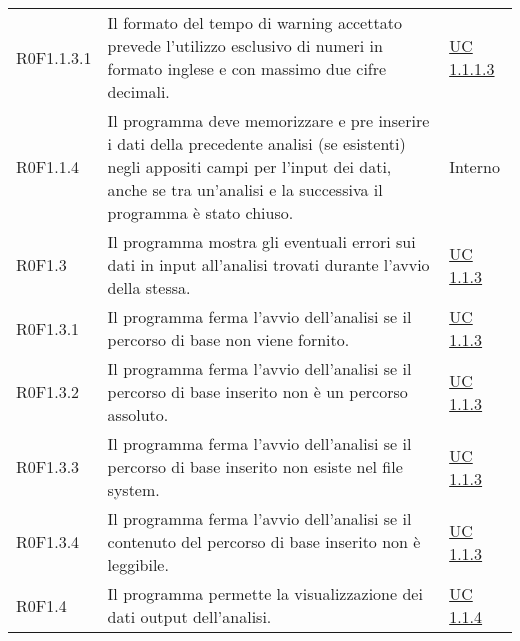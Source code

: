 \begin{center}
\begin{longtable}{p{4.2cm}!{\color{white}\vrule width 0.5mm}p{6cm}!{\color{white}\vrule width 0.5mm}p{2.5cm}!{\color{white}\vrule width 0.5mm}}
				\hspace{6mm}\hypertarget{R0F1.1.3.1}{R0F1.1.3.1}  & Il formato del tempo di warning accettato prevede l'utilizzo esclusivo di numeri in formato inglese e con massimo due cifre decimali. & \hyperref[subsec:UC1.1.1.3]{UC 1.1.1.3}\\
				
				
				\hspace{4mm}\hypertarget{R0F1.1.4}{R0F1.1.4}  & Il programma deve memorizzare e pre inserire i dati della precedente analisi (se esistenti) negli appositi campi per l'input dei dati, anche se tra un'analisi e la successiva il programma è stato chiuso. & Interno\\
				
				
				\hspace{2mm}\hypertarget{R0F1.3}{R0F1.3} & Il programma mostra gli eventuali errori sui dati in input all'analisi trovati durante l'avvio della stessa. & \hyperref[subsec:UC1.1.3]{UC 1.1.3}\\
				
				\hspace{4mm}\hypertarget{R0F1.3.1}{R0F1.3.1} & Il programma ferma l'avvio dell'analisi se il percorso di base non viene fornito. & \hyperref[subsec:UC1.1.3]{UC 1.1.3}\\
				
				\hspace{4mm}\hypertarget{R0F1.3.2}{R0F1.3.2} & Il programma ferma l'avvio dell'analisi se il percorso di base inserito non è un percorso assoluto. & \hyperref[subsec:UC1.1.3]{UC 1.1.3}\\
				
				\hspace{4mm}\hypertarget{R0F1.3.3}{R0F1.3.3} & Il programma ferma l'avvio dell'analisi se il percorso di base inserito non esiste nel file system. & \hyperref[subsec:UC1.1.3]{UC 1.1.3}\\
				
				\hspace{4mm}\hypertarget{R0F1.3.4}{R0F1.3.4} & Il programma ferma l'avvio dell'analisi se il contenuto del percorso di base inserito non è leggibile. & \hyperref[subsec:UC1.1.3]{UC 1.1.3}\\
				
				
				\hspace{2mm}\hypertarget{R0F1.4}{R0F1.4} & Il programma permette la visualizzazione dei dati output dell'analisi. & \hyperref[subsec:UC1.1.4]{UC 1.1.4}\\
				

\end{longtable}
\end{center}

